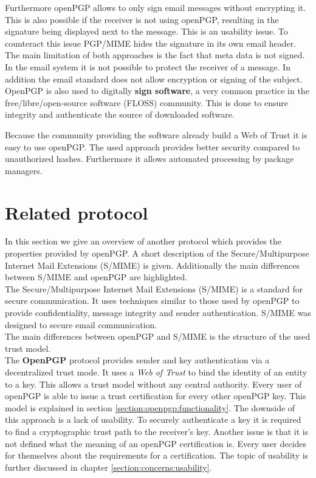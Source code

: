 Furthermore openPGP allows to only sign email messages without encrypting it. This is also possible if the receiver is not using openPGP, resulting in the signature being displayed next to the message. This is an usability issue. To counteract this issue PGP/MIME hides the signature in its own email header. \\


The main limitation of both approaches is the fact that meta data is not signed. In the email system it is not possible to protect the receiver of a message. In addition the email standard does not allow encryption or signing of the subject. \\

OpenPGP is also used to digitally \textbf{sign software}, a very common practice in the free/libre/open-source software (FLOSS) community. This is done to ensure integrity and authenticate the source of downloaded software. 

Because the community providing the software already build a Web of Trust it is easy to use openPGP. The used approach provides better security compared to unauthorized hashes. Furthermore it allows automated processing by package managers.

\section{Related protocol} \label{section:openpgp:smime}

In this section we give an overview of another protocol which provides the properties provided by openPGP. A short description of the Secure/Multipurpose Internet Mail Extensions (S/MIME) is given. Additionally the main differences between S/MIME and openPGP are highlighted. \\

The Secure/Multipurpose Internet Mail Extensions (S/MIME) is a standard for secure communication. It uses techniques similar to those used by openPGP to provide confidentiality, message integrity and sender authentication. S/MIME was designed to secure email communication.  \\

The main differences between openPGP and S/MIME is the structure of the used trust model.  \\

The \textbf{OpenPGP} protocol provides sender and key authentication via a decentralized trust mode. It uses a \textit{Web of Trust} to bind the identity of an entity to a key. This allows a trust model without any central authority. Every user of openPGP is able to issue a trust certification for every other openPGP key. This model is explained in section \ref{section:openpgp:functionality}. The downside of this approach is a lack of usability. To securely authenticate a key it is required to find a cryptographic trust path to the receiver's key. Another issue is that it is not defined what the meaning of an openPGP certification is. Every user decides for themselves about the requirements for a certification. The topic of usability is further discussed in chapter \ref{section:concerns:usability}. \\

